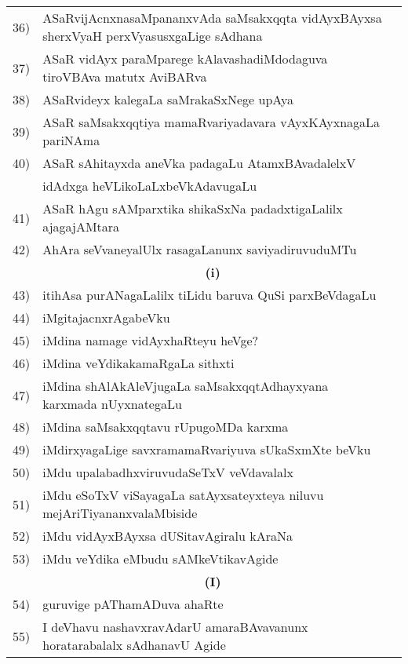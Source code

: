 {\begin{longtable}{@{}cp{7.4cm}r}
36) & ASaRvijAcnxnasaMpananxvAda saMsakxqqta vidAyxBAyxsa sherxVyaH perxVyasusxgaLige sAdhana & \pageref{page42}\\
37) & ASaR vidAyx paraMparege kAlavashadiMdodaguva tiroVBAva matutx AviBARva & \pageref{page92}\\
38) & ASaRvideyx kalegaLa saMrakaSxNege upAya & \pageref{page50} \\
39) & ASaR saMsakxqqtiya mamaRvariyadavara vAyxKAyxnagaLa pariNAma & \pageref{page24}\\
40) & ASaR sAhitayxda aneVka padagaLu AtamxBAvadalelxV & \\
    & idAdxga heVLikoLaLxbeVkAdavugaLu   & \pageref{page246}\\
41) & ASaR hAgu sAMparxtika shikaSxNa padadxtigaLalilx ajagajAMtara  & \pageref{page28}\\
42) & AhAra seVvaneyalUlx rasagaLanunx saviyadiruvuduMTu & \pageref{page221}\\[0.3cm]
    & \multicolumn{1}{c}{\textbf{(i)}} & \\[0.3cm]
43) & itihAsa purANagaLalilx tiLidu baruva QuSi parxBeVdagaLu &  \pageref{page62}\\
44) & iMgitajacnxrAgabeVku  & \pageref{page122}\\
45) & iMdina namage vidAyxhaRteyu heVge? & \pageref{page109}\\
46) & iMdina veYdikakamaRgaLa sithxti & \pageref{page208}\\
47) & iMdina shAlAkAleVjugaLa saMsakxqqtAdhayxyana karxmada nUyxnategaLu & \pageref{page43}\\
48) & iMdina saMsakxqqtavu rUpugoMDa karxma & \pageref{page12}\\
49) & iMdirxyagaLige savxramamaRvariyuva sUkaSxmXte beVku & \pageref{page125}\\
50) & iMdu upalabadhxviruvudaSeTxV veVdavalalx & \pageref{page134}\\
51) & iMdu eSoTxV viSayagaLa satAyxsateyxteya niluvu mejAriTi\-yananxvalaMbiside & \pageref{page215}\\
52) & iMdu vidAyxBAyxsa dUSitavAgiralu kAraNa & \pageref{page41}\\
53) & iMdu veYdika eMbudu sAMkeVtikavAgide & \pageref{page206}\\ [0.3cm]  
    & \multicolumn{1}{c}{\textbf{(I)}} & \\[0.3cm]
54) & guruvige pAThamADuva ahaRte &  \pageref{page105}\\
55) & I deVhavu nashavxravAdarU amaraBAvavanunx horatarabalalx sAdhanavU Agide &\pageref{page129}\\

\end{longtable}}
